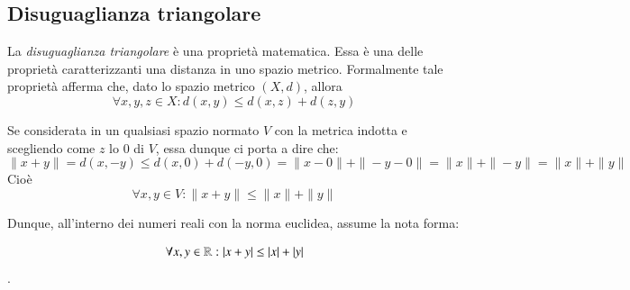 \subsection{Disuguaglianza triangolare}

La \emph{disuguaglianza triangolare} \`e una propriet\`a matematica.
 Essa \`e una delle proprietà caratterizzanti una 
distanza in uno spazio metrico. Formalmente tale propriet\`a
 afferma che, dato lo spazio metrico $(X,d)$, allora
$$\forall x,y,z \in X: d(x,y) \leq d(x,z) + d(z,y)$$


Se considerata in un qualsiasi spazio normato $V$ con la
 metrica indotta e scegliendo come $z$ lo 0 di $V$, essa dunque ci porta a dire che:
$$\|x+y\|= d(x,-y)\leq d(x,0) + d(-y,0)= \|x-0\| + \|-y-0\|= \|x\|
 + \|-y\|=  \|x\| + \|y\|$$
Cio\`e
$$\forall x,y \in V: \|x+y\|\leq \|x\| + \|y\|$$

Dunque, all'interno dei numeri reali con la norma euclidea, assume la nota forma:
\begin{property}
\label{disuguaglianza-triangolare-moduli}
$$\forall x,y \in \mathbb{R}: |x+y| \leq |x| + |y|$$.
 
\end{property}


\outbpdocument
